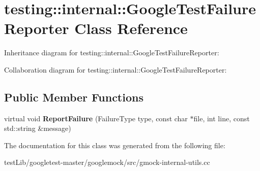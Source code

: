 \hypertarget{classtesting_1_1internal_1_1GoogleTestFailureReporter}{}\section{testing\+:\+:internal\+:\+:Google\+Test\+Failure\+Reporter Class Reference}
\label{classtesting_1_1internal_1_1GoogleTestFailureReporter}


Inheritance diagram for testing\+:\+:internal\+:\+:Google\+Test\+Failure\+Reporter\+:


Collaboration diagram for testing\+:\+:internal\+:\+:Google\+Test\+Failure\+Reporter\+:
\subsection*{Public Member Functions}
\begin{DoxyCompactItemize}
\item 
\mbox{\label{classtesting_1_1internal_1_1GoogleTestFailureReporter_a096dae47177340acac5f3d6528b852ca}} 
virtual void {\bfseries Report\+Failure} (Failure\+Type type, const char $\ast$file, int line, const std\+::string \&message)
\end{DoxyCompactItemize}


The documentation for this class was generated from the following file\+:\begin{DoxyCompactItemize}
\item 
test\+Lib/googletest-\/master/googlemock/src/gmock-\/internal-\/utils.\+cc\end{DoxyCompactItemize}
